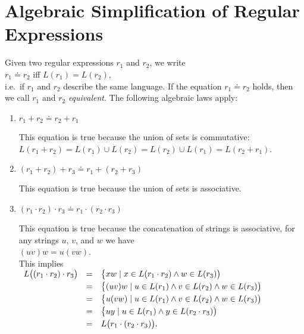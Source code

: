 \section{Algebraic Simplification of Regular Expressions}
Given two regular expressions $r_1$ and $r_2$, we write
\\[0.2cm]
\hspace*{1.3cm}
$r_1 \doteq r_2$ \quad iff \quad $L(r_1) = L(r_2)$,
\\[0.2cm]
i.e.~if $r_1$ and $r_2$ describe the same language.  If the equation $r_1 \doteq r_2$ holds, then we
call $r_1$ and $r_2$ \emph{equivalent}.  The following algebraic laws apply:
\begin{enumerate}
\item $r_1 + r_2 \doteq r_2 + r_1$

      This equation is true because the union of sets is commutative:
      \\[0.2cm]
      \hspace*{1.3cm}
      $L(r_1 + r_2) = L(r_1) \cup L(r_2) = L(r_2) \cup L(r_1) = L(r_2 + r_1)$.
\item $(r_1 + r_2) + r_3 \doteq r_1 + (r_2 + r_3)$

      This equation is true because the union of sets is associative.
\item $(r_1 \cdot r_2) \cdot r_3 \doteq r_1 \cdot (r_2 \cdot r_3)$

      This equation is true because the concatenation of strings is associative, for any strings
      $u$, $v$, and $w$ we have
      \\[0.2cm]
      \hspace*{1.3cm}
      $(u v) w = u (v w)$.
      \\[0.2cm]
      This implies
      \\[0.2cm]
      \hspace*{1.3cm}
      $
      \begin{array}[t]{lcl}
        L\bigl( (r_1 \cdot r_2) \cdot r_3\bigr) 
        & = & \bigl\{ x w \mid x \in L(r_1 \cdot r_2) \wedge w \in L(r_3)\bigr) \\[0.1cm]
        & = & \bigl\{ (u v) w \mid u \in L(r_1) \wedge v \in L(r_2) \wedge w \in L(r_3)\bigr) \\[0.1cm]
        & = & \bigl\{ u (v w) \mid u \in L(r_1) \wedge v \in L(r_2) \wedge w \in L(r_3)\bigr) \\[0.1cm]
        & = & \bigl\{ u y \mid u \in L(r_1) \wedge y \in L(r_2 \cdot r_3)\bigr) \\[0.1cm]
        & = & L\bigl( r_1 \cdot (r_2 \cdot r_3)\bigr).
      \end{array}
      $


\end{enumerate}
